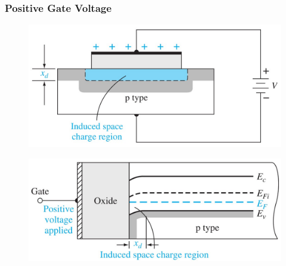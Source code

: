 \documentclass{beamer}
\begin{document}
    \begin{frame} \frametitle{Positive Gate Voltage}
        \begin{minipage}{\linewidth}
            \begin{minipage}{0.45\linewidth}
                \begin{figure}[H]
                    \centering
                    \includegraphics[width=\linewidth]{PMOS-positive-gate-voltage.jpg}
                    \label{fig:PMOS-positive-gate-voltage.jpg}
                \end{figure}
            \end{minipage}
            \begin{minipage}{0.45\linewidth}
                \begin{figure}[H]
                    \centering
                    \includegraphics[width=\linewidth]{PMOS-positive-gate-voltage-energy-band-diagram.jpg}
                    \label{fig:PMOS-positive-gate-voltage-energy-band-diagram.jpg}
                \end{figure}
            \end{minipage}
        \end{minipage}
    \end{frame}
\end{document}
